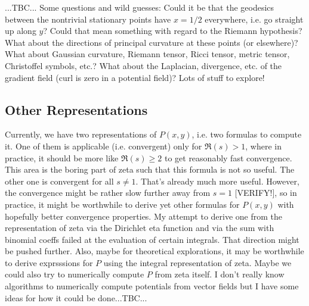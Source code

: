 \documentclass[12pt]{article}
\begin{document}
...TBC... Some questions and wild guesses: Could it be that the geodesics between the nontrivial stationary points have $x=1/2$ everywhere, i.e. go straight up along $y$? Could that mean something with regard to the Riemann hypothesis? What about the directions of principal curvature at these points (or elsewhere)? What about Gaussian curvature, Riemann tensor, Ricci tensor, metric tensor, Christoffel symbols, etc.? What about the Laplacian, divergence, etc. of the gradient field (curl is zero in a potential field)? Lots of stuff to explore!

\subsection{Other Representations}
Currently, we have two representations of $P(x,y)$, i.e. two formulas to compute it. One of them is applicable (i.e. convergent) only for $\Re(s) > 1$, where in practice, it should be more like $\Re(s) \geq 2$ to get reasonably fast convergence. This area is the boring part of zeta such that this formula is not so useful. The other one is convergent for all $s \neq 1$. That's already much more useful. However, the convergence might be rather slow further away from $s=1$ [VERIFY!], so in practice, it might be worthwhile to derive yet other formulas for $P(x,y)$ with hopefully better convergence properties. My attempt to derive one from the representation of zeta via the Dirichlet eta function and via the sum with binomial coeffs failed at the evaluation of certain integrals. That direction might be pushed further. Also, maybe for theoretical explorations, it may be worthwhile to derive exprsssions for $P$ using the integral representation of zeta. Maybe we could also try to numerically compute $P$ from zeta itself. I don't really know algorithms to numerically compute potentials from vector fields but I have some ideas for how it could be done...TBC...




\end{document}
